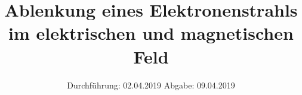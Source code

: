 

\subject{V501/2}
\title{Ablenkung eines Elektronenstrahls im elektrischen und magnetischen Feld}
\date{%
  Durchführung: 02.04.2019
  \hspace{3em}
  Abgabe: 09.04.2019
}



\maketitle
\thispagestyle{empty}
\tableofcontents
\newpage






\printbibliography{}


